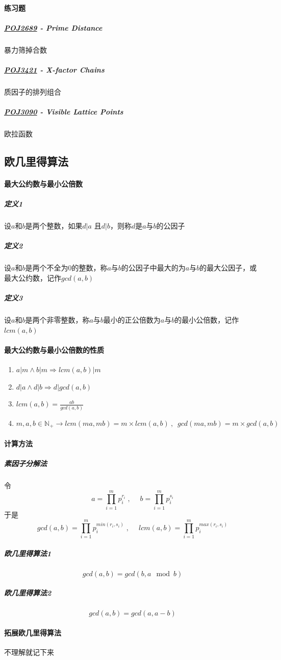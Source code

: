\documentclass[]{cpp}
\begin{document}
\paragraph{练习题}
\subparagraph{\href{http://poj.org/problem?id=2689}{POJ2689} - Prime Distance} 暴力筛掉合数
\subparagraph{\href{http://poj.org/problem?id=3421}{POJ3421} - X-factor Chains} 质因子的排列组合
\subparagraph{\href{http://poj.org/problem?id=3090}{POJ3090} - Visible Lattice Points} 欧拉函数
\subsection{欧几里得算法}
\paragraph{最大公约数与最小公倍数}
\subparagraph{定义1} 设$a$和$b$是两个整数，如果$d|a$ 且$d|b$，则称$d$是$a$与$b$的公因子
\subparagraph{定义2} 设$a$和$b$是两个不全为$0$的整数，称$a$与$b$的公因子中最大的为$a$与$b$的最大公因子，或最大公约数，记作$gcd(a,b)$
\subparagraph{定义3} 设$a$和$b$是两个非零整数，称$a$与$b$最小的正公倍数为$a$与$b$的最小公倍数，记作$lcm(a,b)$
\paragraph{最大公约数与最小公倍数的性质}
	\begin{enumerate}
		\item $a|m \land b|m \Rightarrow lcm(a,b)|m$
		\item $d|a \land d|b \Rightarrow d|gcd(a,b)$
		\item $lcm(a,b)=\frac{ab}{gcd(a,b)}$
		\item $m,a,b\in\mathbb{N_+}\to lcm(ma,mb)=m\times lcm(a,b)\ ,\;\ gcd(ma,mb)=m \times gcd(a,b)$
	\end{enumerate}
\paragraph{计算方法}
\subparagraph{素因子分解法}
	令 $$a=\prod\limits_{i=1}^{m}p_{i}^{r_i}\;,\quad\;b=\prod\limits_{i=1}^{m}p_{i}^{s_i}$$
	于是 $$gcd(a,b)=\prod\limits_{i=1}^{m}p_{i}^{min(r_i,s_i)}\;,\quad\;lcm(a,b)=\prod\limits_{i=1}^{m}p_{i}^{max(r_i,s_i)}$$
\subparagraph{欧几里得算法1} $$gcd(a,b)=gcd(b,a\!\!\!\!\mod b)$$
\subparagraph{欧几里得算法2} $$gcd(a,b)=gcd(a,a-b)$$
\paragraph{拓展欧几里得算法} 不理解就记下来
\end{document}
